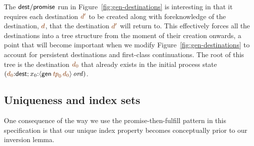 The ${\sf dest/promise}$ run in Figure~\ref{fig:gen-destinations} is
interesting in that it requires each destination $\lf{d'}$ to be
created along with foreknowledge of the destination, $\lf{d}$, that
the destination $\lf{d'}$ will return to. This effectively forces all
the destinations into a tree structure from the moment of their
creation onwards, a point that will become important when we modify
Figure~\ref{fig:gen-destinations} to account for persistent
destinations and first-class continuations. The root of this tree is the
destination $\lf{d_0}$ that already exists in the initial process state
$(\lf{d_0}{:}{\sf dest};
x_0{:}\istrue{\susp{{\sf gen}\,\lf{{\it tp}_0}\,\lf{d_0}}})$.

\subsection{Uniqueness and index sets}
\label{sec:uniqueness-gendests}

One consequence of the way we use the promise-then-fulfill pattern in
this specification is that our unique index property becomes
conceptually prior to our inversion lemma.

